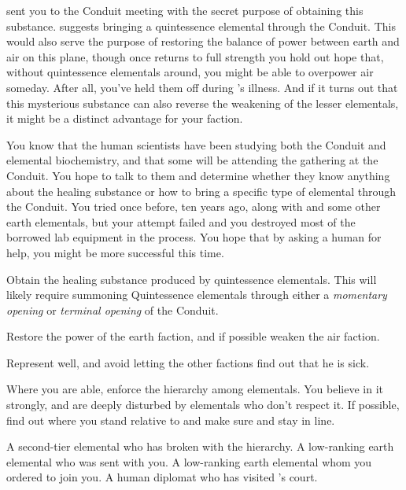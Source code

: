 \documentclass[char]{elementals}
\begin{document}
\cEarthKing{} sent you to the Conduit meeting with the secret purpose of obtaining this substance.  \cEarthKing{\They} suggests bringing a quintessence elemental through the Conduit.  This would also serve the purpose of restoring the balance of power between earth and air on this plane, though once \cEarthKing{} returns to full strength you hold out hope that, without quintessence elementals around, you might be able to overpower air someday.  After all, you've held them off during \cEarthKing{}'s illness.  And if it turns out that this mysterious substance can also reverse the weakening of the lesser elementals, it might be a distinct advantage for your faction.

You know that the human scientists have been studying both the Conduit and elemental biochemistry, and that some will be attending the gathering at the Conduit.  You hope to talk to them and determine whether they know anything about the healing substance or how to bring a specific type of elemental through the Conduit.  You tried once before, ten years ago, along with \cMinion{\intro} and some other earth elementals, but your attempt failed and you destroyed most of the borrowed lab equipment in the  process.  You hope that by asking a human for help, you might be more successful this time.

\begin{itemz}[Goals]
	\item Obtain the healing substance produced by quintessence elementals. This will likely require summoning Quintessence elementals through either a \emph{momentary opening} or \emph{terminal opening} of the Conduit.
	\item Restore the power of the earth faction, and if possible weaken the air faction.
	\item Represent \cEarthKing{} well, and avoid letting the other factions find out that he is sick.
	\item Where you are able, enforce the hierarchy among elementals.  You believe in it strongly, and are deeply disturbed by elementals who don't respect it.  If possible, find out where you stand relative to \cRogue{} and make sure \cMinion{} and \cMiniEarth{} stay in line.
\end{itemz}
 
\begin{contacts}
	\contact{\cRogue{}}  A second-tier elemental who has broken with the hierarchy.
	\contact{\cMinion{}}  A low-ranking earth elemental who was sent with you. 
  \contact{\cMiniEarth{}}  A low-ranking earth elemental whom you ordered to join you.
  \contact{\cAvatar{}}  A human diplomat who has visited \cEarthKing{}'s court.
\end{contacts} 
\end{document}
